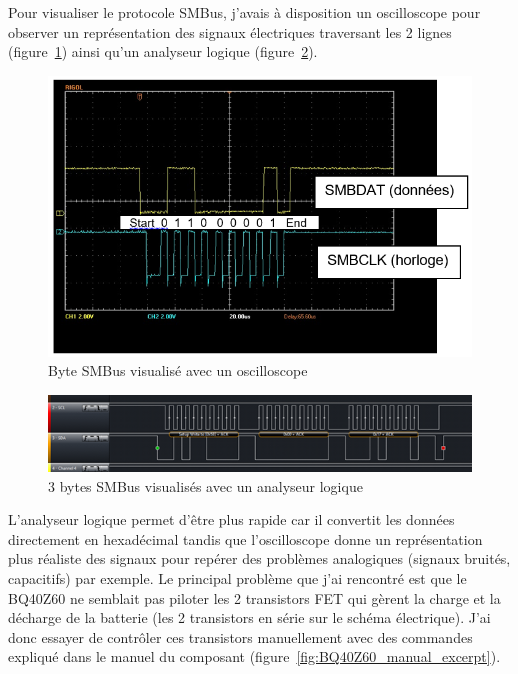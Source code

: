 \documentclass[a4paper, 12pt, sffamily]{report}
\begin{document}
Pour visualiser le protocole SMBus, j’avais à disposition un oscilloscope pour observer un représentation des signaux électriques traversant les 2 lignes (figure~\ref{fig:SMBus_oscilloscope}) ainsi qu’un analyseur logique (figure~\ref{fig:SMBus_logic_analyser}).

\begin{figure}[H]
\centering
\includegraphics[scale=0.6]{figures/screenshots/SMBus_oscilloscope.png}
\caption{Byte SMBus visualisé avec un oscilloscope}
\label{fig:SMBus_oscilloscope}
\end{figure}

\begin{figure}[H]
\centering
\includegraphics[scale=0.9]{figures/screenshots/SMBus_logic_analyser.png}
\caption{3 bytes SMBus visualisés avec un analyseur logique}
\label{fig:SMBus_logic_analyser}
\end{figure}

L’analyseur logique permet d’être plus rapide car il convertit les données directement en hexadécimal tandis que l’oscilloscope donne un représentation plus réaliste des signaux pour repérer des problèmes analogiques (signaux bruités, capacitifs) par exemple.
Le principal problème que j’ai rencontré est que le BQ40Z60 ne semblait pas piloter les 2 transistors FET qui gèrent la charge et la décharge de la batterie (les 2 transistors en série sur le schéma électrique).
J’ai donc essayer de contrôler ces transistors manuellement avec des commandes expliqué dans le manuel du composant (figure~\ref{fig:BQ40Z60_manual_excerpt}).
\end{document}
